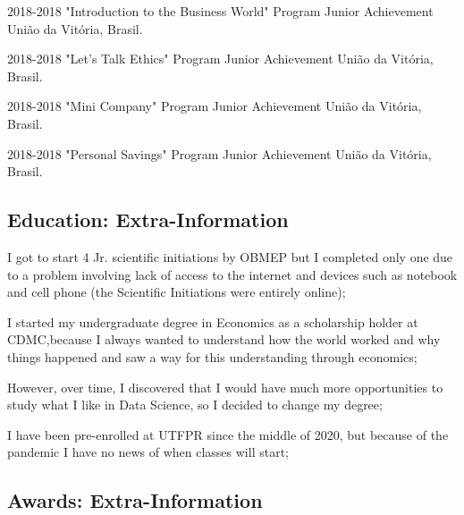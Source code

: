 \begin{paracol}{2}
\begin{rightcolumn}
		
		\cvevent
		{2018-2018} {"Introduction to the Business World" Program} {Junior Achievement \newline União da Vitória, Brasil.}
		\vfill\null
		\vfill\null
		
		\cvevent
		{2018-2018} {"Let’s Talk Ethics" Program} {Junior Achievement \newline União da Vitória, Brasil.}
		\vfill\null
		\vfill\null
		
		\cvevent
		{2018-2018} {"Mini Company" Program} {Junior Achievement \newline União da Vitória, Brasil.}
		\vfill\null
		\vfill\null
		
		\cvevent
		{2018-2018} {"Personal Savings" Program} {Junior Achievement \newline União da Vitória, Brasil.}
		\vfill\null
		\vfill\null
		
		\small
		
		
		\subsection*{Education: Extra-Information}
		I got to start 4 Jr. scientific initiations by OBMEP but I completed only one due to a problem involving lack of access to the internet and devices such as notebook and cell phone (the Scientific Initiations were entirely online);\newline
		
		I started my undergraduate degree in Economics as a scholarship holder at CDMC,because I always wanted to understand how the world worked and why things happened and saw a way for this understanding through economics;\newline
		
		However, over time, I discovered that I would have much more opportunities to study what I like in Data Science, so I decided to change my degree;\newline
		
		I have been pre-enrolled at UTFPR since the middle of 2020, but because of the pandemic I have no news of when classes will start;\newline
		
		
		\subsection*{Awards: Extra-Information}
		

\end{rightcolumn}
\end{paracol}

